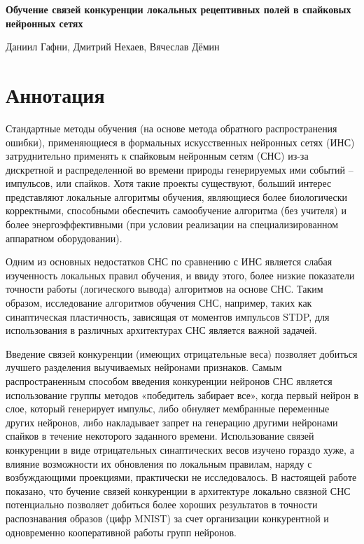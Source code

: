 \documentclass[a4paper]{article}
\begin{document}
\thispagestyle{empty}

\begin{center}
    \large\textbf{Обучение связей конкуренции локальных рецептивных полей в спайковых нейронных сетях}\\
    \hfill\break
    
    Даниил Гафни, Дмитрий Нехаев, Вячеслав Дёмин
\end{center}





\section*{Аннотация}
Стандартные методы обучения (на основе метода обратного распространения ошибки), применяющиеся в формальных искусственных нейронных сетях (ИНС) затруднительно применять к спайковым нейронным сетям (СНС) из-за дискретной и распределенной во времени природы генерируемых ими событий – импульсов, или спайков. Хотя такие проекты существуют, больший интерес представляют локальные алгоритмы обучения, являющиеся более биологически корректными, способными обеспечить самообучение алгоритма (без учителя) и более энергоэффективными (при условии реализации на специализированном аппаратном оборудовании). 

Одним из основных недостатков СНС по сравнению с ИНС является слабая изученность локальных правил обучения, и ввиду этого, более низкие показатели точности работы (логического вывода) алгоритмов на основе СНС. Таким образом, исследование алгоритмов обучения СНС, например, таких как синаптическая пластичность, зависящая от моментов импульсов STDP, для использования в различных архитектурах СНС является важной задачей. 

Введение связей конкуренции (имеющих отрицательные веса) позволяет добиться лучшего разделения выучиваемых нейронами признаков. Самым распространенным способом введения конкуренции нейронов СНС является использование группы методов «победитель забирает все», когда первый нейрон в слое, который генерирует импульс, либо обнуляет мембранные переменные других нейронов, либо накладывает запрет на генерацию другими нейронами спайков в течение некоторого заданного времени. Использование связей конкуренции в виде отрицательных синаптических весов изучено гораздо хуже, а влияние возможности их обновления по локальным правилам, наряду с возбуждающими проекциями, практически не исследовалось. В настоящей работе показано, что бучение связей конкуренции в архитектуре локально связной СНС потенциально позволяет добиться более хороших результатов в точности распознавания образов (цифр MNIST) за счет организации конкурентной и одновременно кооперативной работы групп нейронов.
\end{document}
